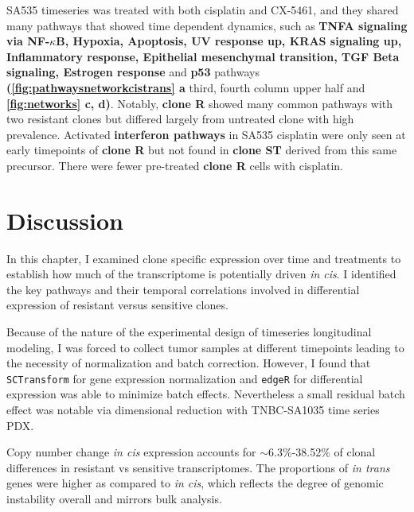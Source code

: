 
SA535 timeseries was treated with both cisplatin and CX-5461, and they shared many pathways that showed time dependent dynamics, such as \textbf{TNFA signaling via NF-$\kappa$B, Hypoxia, Apoptosis, UV response up, KRAS signaling up, Inflammatory response, Epithelial mesenchymal transition, TGF Beta signaling, Estrogen response} and \textbf{p53} pathways \textbf{(\autoref{fig:pathwaysnetworkcistrans} a} third, fourth column upper half and \textbf{\autoref{fig:networks} c, d)}. 
Notably, \textbf{clone R} showed many common pathways with two resistant clones but differed largely from untreated clone with high prevalence. Activated \textbf{interferon pathways} in SA535 cisplatin were only seen at early timepoints of \textbf{clone R} but not found in \textbf{clone ST} derived from this same precursor. There were fewer pre-treated   \textbf{clone R} cells with cisplatin.  


\section{Discussion}
In this chapter, I examined clone specific expression over time and treatments to establish how much of the transcriptome is potentially driven \textit{in cis}. I identified the key pathways and their temporal correlations involved in differential expression of resistant versus sensitive clones.

Because of the nature of the experimental design of timeseries longitudinal modeling, I was forced to collect tumor samples at different timepoints leading to the necessity of normalization and batch correction. 
However, I found that \texttt{SCTransform} for gene expression normalization and \texttt{edgeR} for differential expression was able to minimize batch effects. Nevertheless a small residual batch effect was notable via dimensional reduction with TNBC-SA1035 time series PDX. 
 

Copy number change \textit{in cis} expression accounts for $\sim${6.3\%-38.52\%} of clonal differences in resistant vs sensitive transcriptomes. The proportions of \textit{in trans} genes were higher as compared to \textit{in cis}, which reflects the degree of genomic instability overall and mirrors bulk analysis.
 
